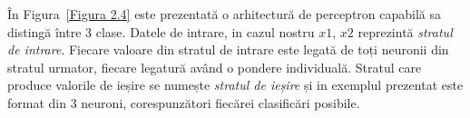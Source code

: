 În Figura~\ref{Figura 2.4} este prezentată o arhitectură de perceptron capabilă sa distingă între 3 clase. Datele de intrare, in cazul nostru $x1$, $x2$ reprezintă \textit{stratul de intrare}. Fiecare valoare din stratul de intrare este legată de toți neuronii din stratul urmator, fiecare legatură având o pondere individuală. Stratul care produce valorile de ieșire se numește \textit{stratul de ieșire} și in exemplul prezentat este format din 3 neuroni, corespunzători fiecărei clasificări posibile. 





    


